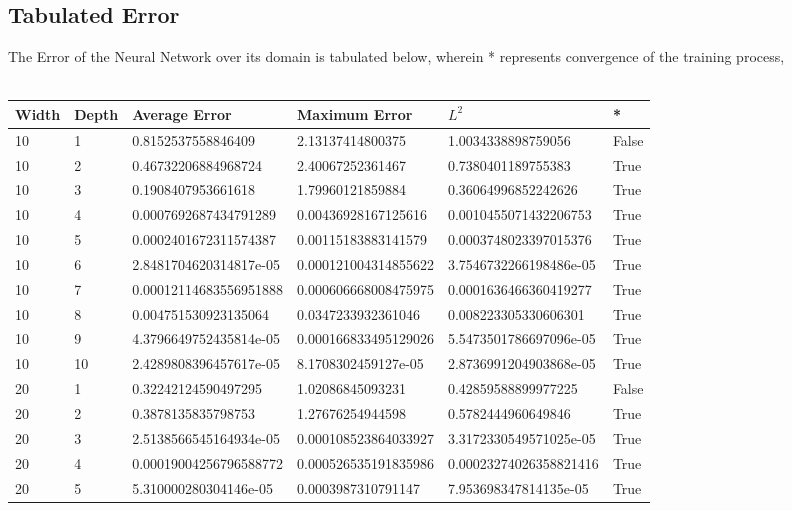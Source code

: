 \documentclass[a4paper, 12pt]{report}
\def\tabsize{4.4cm}
\def\stabsize{0.97cm}
\def\mtabsize{0.73cm}
\begin{document}
\begin{center}
\subsection{Tabulated Error}
The Error of the Neural Network over its domain is tabulated below, wherein * represents convergence of the training process,
\\~\\\begin{longtable}{|m{\stabsize}|m{\stabsize}|m{\tabsize}|m{\tabsize}|m{\tabsize}|m{\mtabsize}|}
\hline
Width & Depth & Average Error & Maximum Error & $L^2$ & * \\ \hline
10 & 1 & 0.8152537558846409 & 2.13137414800375 & 1.0034338898759056 & False \\ \hline  
10 & 2 & 0.46732206884968724 & 2.40067252361467 & 0.7380401189755383 & True \\ \hline  
10 & 3 & 0.1908407953661618 & 1.79960121859884 & 0.36064996852242626 & True \\ \hline  
10 & 4 & 0.0007692687434791289 & 0.00436928167125616 & 0.0010455071432206753 & True \\ \hline  
10 & 5 & 0.0002401672311574387 & 0.00115183883141579 & 0.0003748023397015376 & True \\ \hline  
10 & 6 & 2.8481704620314817e-05 & 0.000121004314855622 & 3.7546732266198486e-05 & True \\ \hline  
10 & 7 & 0.00012114683556951888 & 0.000606668008475975 & 0.0001636466360419277 & True \\ \hline  
10 & 8 & 0.004751530923135064 & 0.0347233932361046 & 0.008223305330606301 & True \\ \hline  
10 & 9 & 4.3796649752435814e-05 & 0.000166833495129026 & 5.5473501786697096e-05 & True \\ \hline  
10 & 10 & 2.4289808396457617e-05 & 8.1708302459127e-05 & 2.8736991204903868e-05 & True \\ \hline  
20 & 1 & 0.32242124590497295 & 1.02086845093231 & 0.42859588899977225 & False \\ \hline  
20 & 2 & 0.3878135835798753 & 1.27676254944598 & 0.5782444960649846 & True \\ \hline  
20 & 3 & 2.5138566545164934e-05 & 0.000108523864033927 & 3.3172330549571025e-05 & True \\ \hline  
20 & 4 & 0.00019004256796588772 & 0.000526535191835986 & 0.00023274026358821416 & True \\ \hline  
20 & 5 & 5.310000280304146e-05 & 0.0003987310791147 & 7.953698347814135e-05 & True \\ \hline  

\end{longtable}
\end{center}
\end{document}
